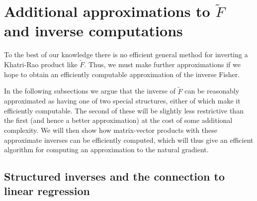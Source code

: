 \documentclass[12pt]{article}
\newcommand{\expected}{\operatorname{E}}
\begin{document}




\section{Additional approximations to $\tilde{F}$ and inverse computations}
\label{sec:structured_precision_approx}

To the best of our knowledge there is no efficient general method for inverting a Khatri-Rao product like $\tilde{F}$.  Thus, we must make further approximations if we hope to obtain an efficiently computable approximation of the inverse Fisher.

In the following subsections we argue that the inverse of $\tilde{F}$ can be reasonably approximated as having one of two special structures, either of which make it efficiently computable.  The second of these will be slightly less restrictive than the first (and hence a better approximation) at the cost of some additional complexity.  We will then show how matrix-vector products with these approximate inverses can be efficiently computed, which will thus give an efficient algorithm for computing an approximation to the natural gradient.

\subsection{Structured inverses and the connection to linear regression}


\end{document}
